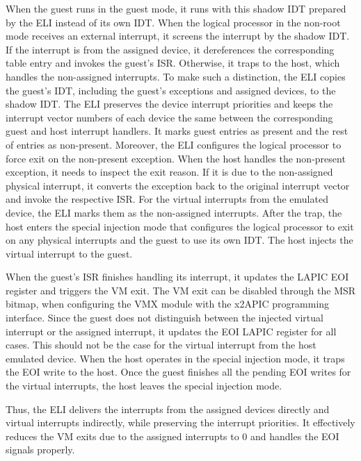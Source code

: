 {When the guest runs in the guest mode, it runs with this
shadow IDT prepared by the ELI instead of its own IDT. When
the logical processor in the non-root mode receives an
external interrupt, it screens the interrupt by the shadow
IDT. If the interrupt is from the assigned device, it
dereferences the corresponding table entry and invokes the
guest's ISR. Otherwise, it traps to the host, which handles
the non-assigned interrupts. To make such a distinction, the
ELI copies the guest's IDT, including the guest's exceptions
and assigned devices, to the shadow IDT. The ELI preserves
the device interrupt priorities and keeps the interrupt vector
numbers of each device the same between the corresponding
guest and host interrupt handlers. It marks guest entries as
present and the rest of entries as non-present. Moreover, the
ELI configures the logical processor to force exit on the
non-present exception. When the host handles the non-present
exception, it needs to inspect the exit reason. If it is due
to the non-assigned physical interrupt, it converts the
exception back to the original interrupt vector and invoke the
respective ISR. For the virtual interrupts from the emulated
device, the ELI marks them as the non-assigned interrupts.
After the trap, the host enters the special injection mode
that configures the logical processor to exit on any physical
interrupts and the guest to use its own IDT. The host injects
the virtual interrupt to the guest.

When the guest's ISR finishes handling its interrupt, it
updates the LAPIC EOI register and triggers the VM exit. The
VM exit can be disabled through the MSR bitmap, when
configuring the VMX module with the x2APIC programming
interface. Since the guest does not distinguish between the
injected virtual interrupt or the assigned interrupt, it
updates the EOI LAPIC register for all cases. This should not
be the case for the virtual interrupt from the host emulated
device. When the host operates in the special injection mode,
it traps the EOI write to the host. Once the guest finishes
all the pending EOI writes for the virtual interrupts, the
host leaves the special injection mode.

Thus, the ELI delivers the interrupts from the assigned
devices directly and virtual interrupts indirectly, while
preserving the interrupt priorities. It effectively reduces
the VM exits due to the assigned interrupts to 0 and handles
the EOI signals properly.

}

